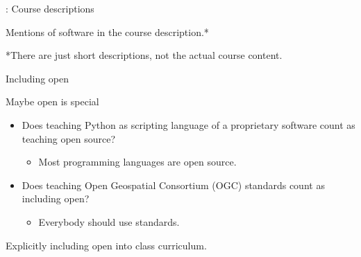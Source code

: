 \documentclass[xcolor={dvipsnames,usenames},beamer,aspectratio=169]{beamer}
\begin{document}
\begin{frame}{\coursesTitle: Course descriptions}

Mentions of software in the course description.*


*There are just short descriptions, not the actual course content.

\end{frame}


\begin{frame}{Including open}

\begin{block}{Maybe open is special}
\begin{itemize}
 \item Does teaching Python as scripting language of a proprietary
       software count as teaching open source?
       \begin{itemize}
       \item Most programming languages are open source.
       \end{itemize}
 \item Does teaching Open Geospatial Consortium (OGC) standards
       count as including open?
       \begin{itemize}
       \item Everybody should use standards.
       \end{itemize}
\end{itemize}
\end{block}

\Large
\textrightarrow Explicitly including open into class curriculum.

\end{frame}
\end{document}
